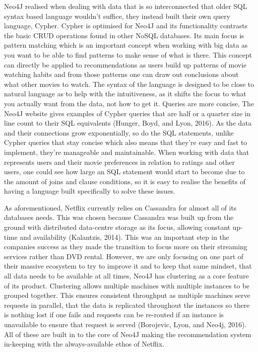 \documentclass[a4paper]{article}
\begin{document}
Neo4J realised when dealing with data that is so interconnected that older SQL syntax based language wouldn't suffice, they instead built their own query language, Cypher. Cypher is optimised for Neo4J and its functionality contrasts the basic CRUD operations found in other NoSQL databases. Its main focus is pattern matching which is an important concept when working with big data as you want to be able to find patterns to make sense of what is there. This concept can directly be applied to recommendations as users build up patterns of movie watching habits and from those patterns one can draw out conclusions about what other movies to watch. The syntax of the language is designed to be close to natural language as to help with the intuitiveness, as it shifts the focus to what you actually want from the data, not how to get it. Queries are more concise, The Neo4J website gives examples of Cypher queries that are half or a quarter size in line count to their SQL equivalents (Hunger, Boyd, and Lyon, 2016). As the data and their connections grow exponentially, so do the SQL statements, unlike Cypher queries that stay concise which also means that they're easy and fast to implement, they're manageable and maintainable. When working with data that represents users and their movie preferences in relation to ratings and other users, one could see how large an SQL statement would start to become due to the amount of joins and clause conditions, so it is easy to realise the benefits of having a language built specifically to solve these issues. \par

As aforementioned, Netflix currently relies on Cassandra for almost all of its databases needs. This was chosen because Cassandra was built up from the ground with distributed data-centre storage as its focus, allowing constant up-time and availability (Kalantzis, 2014). This was an important step in the companies success as they made the transition to focus more on their streaming services rather than DVD rental. However, we are only focusing on one part of their massive ecosystem to try to improve it and to keep that same mindset, that all data needs to be available at all times, Neo4J has clustering as a core feature of its product. Clustering allows multiple machines with multiple instances to be grouped together. This ensures consistent throughput as multiple machines serve requests in parallel, that the data is replicated throughout the instances so there is nothing lost if one fails and requests can be re-routed if an instance is unavailable to ensure that request is served (Borojevic, Lyon, and Neo4j, 2016). All of these are built in to the core of Neo4J making the recommendation system in-keeping with the always-available ethos of Netflix. \par
\end{document}
